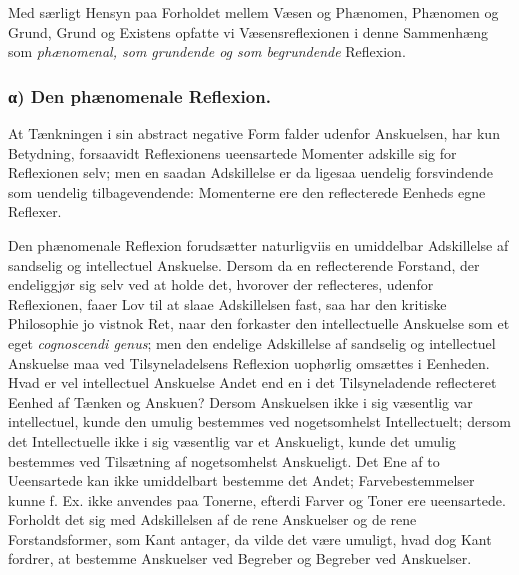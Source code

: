 \documentclass[11pt]{book}
\newcommand{\opage}[1]{\marginnote{\footnotesize\textit{[#1]}}}
\begin{document}
Med særligt Hensyn paa Forholdet mellem Væsen og Phænomen, Phænomen og Grund, Grund og Existens opfatte vi Væsensreflexionen i denne Sammenhæng som \emph{phænomenal, som grundende og som begrundende} Reflexion.

\subsubsection*{α) Den phænomenale Reflexion.}

At Tænkningen i sin abstract negative Form falder udenfor Anskuelsen, har kun Betydning, forsaavidt Reflexionens ueensartede Momenter adskille sig for Reflexionen selv;
\opage{78} \setcounter{footnote}{0}%
men en saadan Adskillelse er da ligesaa uendelig forsvindende som uendelig tilbagevendende: Momenterne ere den reflecterede Eenheds egne Reflexer.

Den phænomenale Reflexion forudsætter naturligviis en umiddelbar Adskillelse af sandselig og intellectuel Anskuelse. Dersom da en reflecterende Forstand, der endeliggjør sig selv ved at holde det, hvorover der reflecteres, udenfor Reflexionen, faaer Lov til at slaae Adskillelsen fast, saa har den kritiske Philosophie jo vistnok Ret, naar den forkaster den intellectuelle Anskuelse som et eget \textit{cognoscendi genus}; men den endelige Adskillelse af sandselig og intellectuel Anskuelse maa ved Tilsyneladelsens Reflexion uophørlig omsættes i Eenheden. Hvad er vel intellectuel Anskuelse Andet end en i det Tilsyneladende reflecteret Eenhed af Tænken og Anskuen? Dersom Anskuelsen ikke i sig væsentlig var intellectuel, kunde den umulig bestemmes ved nogetsomhelst Intellectuelt; dersom det Intellectuelle ikke i sig væsentlig var et Anskueligt, kunde det umulig bestemmes ved Tilsætning af nogetsomhelst Anskueligt. Det Ene af to Ueensartede kan ikke umiddelbart bestemme det Andet; Farvebestemmelser kunne f. Ex. ikke anvendes paa Tonerne, efterdi Farver og Toner ere ueensartede. Forholdt det sig med Adskillelsen af de rene Anskuelser og de rene Forstandsformer, som Kant antager, da vilde det være umuligt, hvad dog Kant fordrer, at bestemme Anskuelser ved Begreber og Begreber ved Anskuelser.
\end{document}
